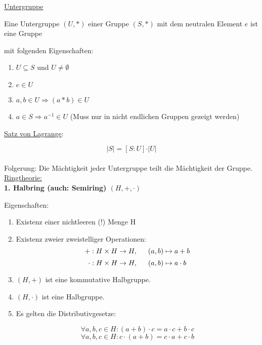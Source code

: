\documentclass[18pt] {article}
\begin{document}
\large{\underline{Untergruppe}}

Eine Untergruppe $(U, *)$ einer Gruppe $(S, *)$ mit dem neutralen Element $e$ ist eine Gruppe 

mit folgenden Eigenschaften:\\

\begin{enumerate}
\item $U \subseteq S$ und $U \neq \emptyset$

\item $e \in U$

\item $a, b \in U \Rightarrow (a * b) \in U$

\item $a \in S \Rightarrow a^{-1} \in U$ (Muss nur in nicht endlichen Gruppen gezeigt werden)\\
\end{enumerate}
\pagebreak

\underline{Satz von Lagrange}:

$$\vert S  \vert = [S : U] \cdot \vert U \vert$$\\

Folgerung: Die Mächtigkeit jeder Untergruppe teilt die Mächtigkeit der Gruppe.\\


\bigskip
\underline{\huge Ringtheorie:}\\

\textbf{1. Halbring (auch: Semiring) $(H, +, \cdot)$}
\begin{framed}
Eigenschaften: \\

\begin{enumerate}
\item Existenz einer nichtleeren (!) Menge H

\item Existenz zweier zweistelliger Operationen:\\
$$+: H \times H \rightarrow H, \indent (a, b) \mapsto a + b$$
$$\cdot : H \times H \rightarrow H, \indent (a, b) \mapsto a \cdot b$$

\item $(H, +)$ ist eine kommutative Halbgruppe.

\item $(H, \cdot )$ ist eine Halbgruppe. 

\item Es gelten die Distributivgesetze:

$$ \forall a, b, c \in H : (a + b) \cdot c = a \cdot c + b \cdot c$$
$$ \forall a, b, c \in H : c \cdot (a + b) = c \cdot a + c \cdot b$$
\end{enumerate}
\end{framed}
\bigskip
\end{document}
